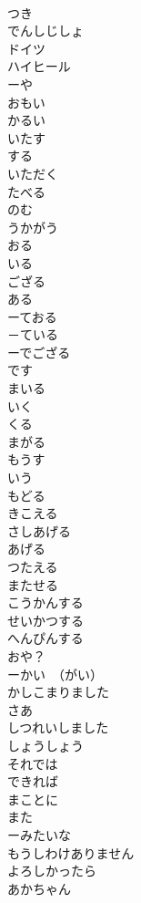 \documentclass[8pt]{extreport}
\begin{document}
\begin{CJK}{UTF8}{min}
\\	つき	
\\	でんしじしょ	
\\	ドイツ	
\\	ハイヒール	
\\	ーや	
\\	おもい	
\\	かるい	
\\	いたす	
\\	する
\\	いただく	
\\	たべる 
\\	のむ
\\	うかがう	
\\	おる	
\\	いる
\\	ござる	
\\	ある
\\	ーておる	
\\	－ている
\\	ーでござる	
\\	です
\\	まいる	
\\	いく 
\\	くる
\\	まがる	
\\	もうす	
\\	いう
\\	もどる	
\\	きこえる	
\\	さしあげる	
\\	あげる
\\	つたえる	
\\	またせる	
\\	こうかんする	
\\	せいかつする	
\\	へんぴんする	
\\	おや？	
\\	ーかい　（がい）	
\\	かしこまりました	
\\	さあ	
\\	しつれいしました	
\\	しょうしょう	
\\	それでは	
\\	できれば	
\\	まことに	
\\	また	
\\	ーみたいな
\\	もうしわけありません	
\\	よろしかったら	
\\	あかちゃん	

\end{CJK}
\end{document}
